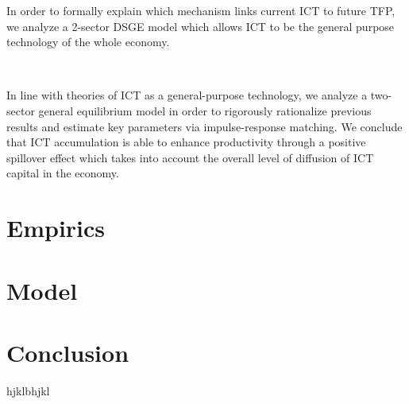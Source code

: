 \documentclass[14pt]{article}
\begin{document}
In order to formally explain which mechanism links current ICT to future TFP, we analyze a 2-sector DSGE model which allows ICT to be the general purpose technology of the whole economy.



\




In line with theories of ICT as a general-purpose technology, we analyze a two-sector general equilibrium model in order to rigorously rationalize previous results and estimate key parameters via impulse-response matching. We conclude that ICT accumulation is able to enhance productivity through a positive spillover effect which takes into account the overall level of diffusion of ICT capital in the economy.





\section{Empirics}



\section{Model}




\section{Conclusion}
hjklbhjkl







 
\end{document}
